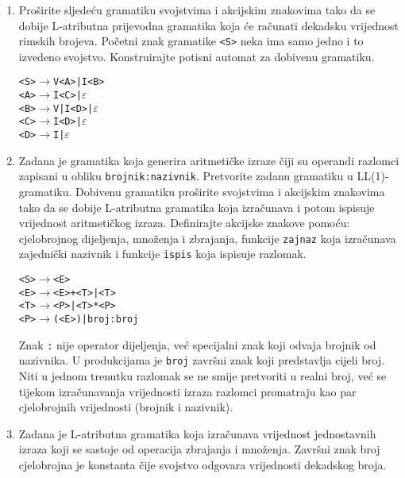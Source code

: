 \documentclass[times, 12pt, utf8]{book}
\begin{document}
\begin{enumerate}[resume]

\item 
Proširite sljedeću gramatiku svojstvima i akcijskim znakovima tako da se dobije L-atributna prijevodna gramatika koja će računati dekadsku vrijednost rimskih brojeva.
Početni znak gramatike \texttt{<S>} neka ima samo jedno i to izvedeno svojstvo.
Konstruirajte potisni automat za dobivenu gramatiku. \cite[str.~180-195]{udzbenik} \cite{auditorne}

\noindent
\begin{alltt}
<S> \(\to\) V<A> | I<B>
<A> \(\to\) I<C> | \(\varepsilon\)
<B> \(\to\) V | I<D> | \(\varepsilon\)
<C> \(\to\) I<D> | \(\varepsilon\)
<D> \(\to\) I | \(\varepsilon\)
\end{alltt}

\item
Zadana je gramatika koja generira aritmetičke izraze čiji su operandi razlomci zapisani u obliku \texttt{brojnik:nazivnik}.
Pretvorite zadanu gramatiku u LL(1)-gramatiku.
Dobivenu gramatiku proširite svojstvima i akcijskim znakovima tako da se dobije L-atributna gramatika koja izračunava i potom ispisuje vrijednost aritmetičkog izraza.
Definirajte akcijske znakove pomoću: cjelobrojnog dijeljenja, množenja i zbrajanja, funkcije \texttt{zajnaz} koja izračunava zajednički nazivnik i funkcije \texttt{ispis} koja ispisuje razlomak.

\begin{alltt}
<S> \(\to\) <E>
<E> \(\to\) <E>+<T> | <T>
<T> \(\to\) <P> | <T>*<P>
<P> \(\to\) (<E>) | broj:broj
\end{alltt}

Znak \texttt{:} nije operator dijeljenja, već specijalni znak koji odvaja brojnik od nazivnika.
U produkcijama je \texttt{broj} završni znak koji predstavlja cijeli broj.
Niti u jednom trenutku razlomak se ne smije pretvoriti u realni broj, već se tijekom izračunavanja vrijednosti izraza razlomci promatraju kao par cjelobrojnih vrijednosti (brojnik i nazivnik). \cite[str.~107-111, 180-183]{udzbenik} \cite{auditorne}

\item
Zadana je L-atributna gramatika koja izračunava vrijednost jednostavnih izraza koji se sastoje od operacija zbrajanja i množenja.
Završni znak broj cjelobrojna je konstanta čije svojstvo odgovara vrijednosti dekadskog broja. \cite[str.~180-198]{udzbenik} \cite{auditorne}


\end{enumerate}
\end{document}
